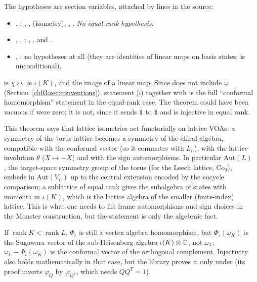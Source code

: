 \begin{dictionary}
The hypotheses are section variables, attached by  lines in the source:
\begin{itemize}
\item {}, : , ,
   (isometry), , . \emph{No equal-rank hypothesis.}
\item {}, , :
  , ,  and .
\item {}, : no hypotheses at all (they are identities
  of linear maps on basis states;  is unconditional).
\end{itemize}
 is $\chi\circ\iota$.  is $\iota(K)$, and
 the image of a linear map. Since  does not include $\omega$
(Section~\ref{ch03:sec:conventions}), statement (i) together with  is the full
``conformal homomorphism'' statement in the equal-rank case. The theorem could have been vacuous
if  were zero; it is not, since it sends $\mathbb 1$ to $\mathbb 1$ and is injective
in equal rank.
\end{dictionary}

\begin{physics}
This theorem says that lattice isometries act functorially on lattice VOAs: a symmetry of the torus lattice becomes a symmetry of the chiral algebra, compatible with the conformal vector (so it commutes with $L_n$), with the lattice involution $\theta$ ($X\mapsto-X$) and with the sign automorphisms. In particular $\mathrm{Aut}(L)$, the target-space symmetry group of the torus (for the Leech lattice, $\mathrm{Co}_0$), embeds in $\mathrm{Aut}(V_L)$ up to the central extension encoded by the cocycle comparison; a sublattice of equal rank gives the subalgebra of states with momenta in $\iota(K)$, which is the lattice algebra of the smaller (finite-index) lattice. This is what one needs to lift frame automorphisms and sign choices in the Monster construction, but the statement is only the algebraic fact.
\end{physics}

\begin{remark}\label{ch03:rem:notconformal}
If $\operatorname{rank}K<\operatorname{rank}L$, $\Phi_\iota$ is still a vertex algebra
homomorphism, but $\Phi_\iota(\omega_K)$ is the Sugawara vector of the sub-Heisenberg algebra
$\iota(K)\otimes{\mathbb{C}}$, not $\omega_L$; $\omega_L-\Phi_\iota(\omega_K)$ is the conformal vector of the
orthogonal complement. Injectivity also holds mathematically in that case, but the library proves
it only under  (its proof inverts $\varphi_Q$ by $\varphi_{Q^T}$, which needs
$QQ^T=1$).
\end{remark}

